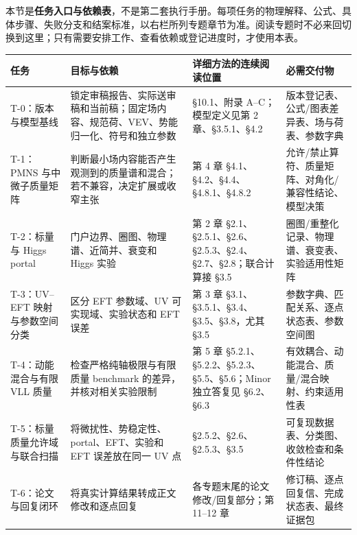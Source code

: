 \documentclass[
  chinese,
  UTF8]{ctexart}
\newcounter{none} %
\begin{document}
本节是\textbf{任务入口与依赖表}，不是第二套执行手册。每项任务的物理解释、公式、具体步骤、失败分支和结案标准，以右栏所列专题章节为准。阅读专题时不必来回切换到这里；只有需要安排工作、查看依赖或登记进度时，才使用本表。

{\def\LTcaptype{none} %
\begin{longtable}[]{@{}
  >{\raggedright\arraybackslash}p{}
  >{\raggedright\arraybackslash}p{}
  >{\raggedright\arraybackslash}p{}
  >{\raggedright\arraybackslash}p{}@{}}
\toprule\noalign{}
\begin{minipage}[b]{\linewidth}\raggedright
任务
\end{minipage} & \begin{minipage}[b]{\linewidth}\raggedright
目标与依赖
\end{minipage} & \begin{minipage}[b]{\linewidth}\raggedright
详细方法的连续阅读位置
\end{minipage} & \begin{minipage}[b]{\linewidth}\raggedright
必需交付物
\end{minipage} \\
\midrule\noalign{}
\endhead
\bottomrule\noalign{}
\endlastfoot
T-0：版本与模型基线 &
锁定审稿报告、实际送审稿和当前稿；固定场内容、规范荷、VEV、势能归一化、符号和独立参数
& §10.1、附录 A--C；模型定义见第 2 章、§3.5.1、§4.2 &
版本登记表、公式/图表差异表、场与荷表、参数字典 \\
T-1：PMNS 与中微子质量矩阵 &
判断最小场内容能否产生观测到的质量谱和混合；若不兼容，决定扩展或收窄主张
& 第 4 章 §4.1、§4.2、§4.4、§4.8.1、§4.8.2 &
允许/禁止算符、质量矩阵、对角化/兼容性结论、模型决策 \\
T-2：标量与 Higgs portal & 门户边界、圈图、物理谱、近简并、衰变和 Higgs
实验 & 第 2 章 §2.1、§2.5.1、§2.6、§2.5.3、§2.4、§2.7、§2.8；联合计算接
§3.5 & 圈图/重整化记录、物理谱、衰变表、实验适用性矩阵 \\
T-3：UV--EFT 映射与参数空间分类 & 区分 EFT 参数域、UV
可实现域、实验状态和 EFT 误差 & 第 3 章
§3.1、§3.5.1、§3.4、§3.5、§3.8，尤其 §3.5 &
参数字典、匹配关系、逐点状态表、参数空间图 \\
T-4：动能混合与有限 VLL 质量 & 检查严格纯轴极限与有限质量 benchmark
的差异，并核对相关实验限制 & 第 5 章
§5.2.1、§5.2.2、§5.2.3、§5.5、§5.6；Minor 独立答复见 §6.2、§6.3 &
有效耦合、动能混合、质量/混合映射、约束适用性表 \\
T-5：标量质量允许域与联合扫描 & 将微扰性、势稳定性、portal、EFT、实验和
EFT 误差放在同一 UV 点 & §2.5.2、§2.6、§2.5.3、§3.5 &
可复现数据表、分类图、收敛检查和条件性结论 \\
T-6：论文与回复闭环 & 将真实计算结果转成正文修改和逐点回复 &
各专题末尾的论文修改/回复部分；第 11--12 章 &
修订稿、逐点回复信、完成状态表、最终证据包 \\
\end{longtable}
}
\end{document}
